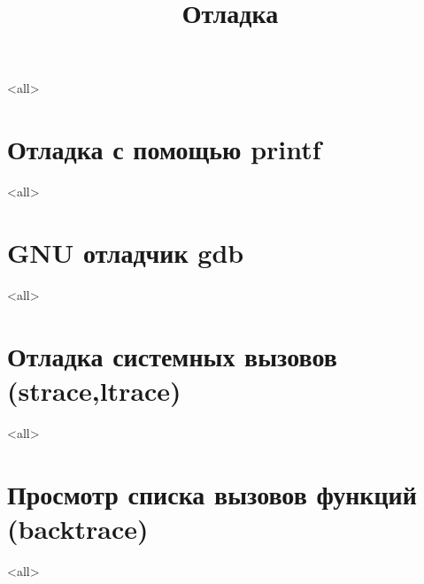 

\title[Отладка]{Отладка}





\begin{frame}
	\frametitle{}
	\titlepage
	\vspace{-0.5cm}
	\begin{center}
	\end{center}
\end{frame}

\begin{frame}
	\tableofcontents
\end{frame}



\mode<all>{}

\section{Отладка с помощью printf}

\mode<all>{}

\section{GNU отладчик gdb}
\mode<all>{}

\section{Отладка системных вызовов (strace,ltrace)}
\mode<all>{}

\section{Просмотр списка вызовов функций (backtrace)}
\mode<all>{}



